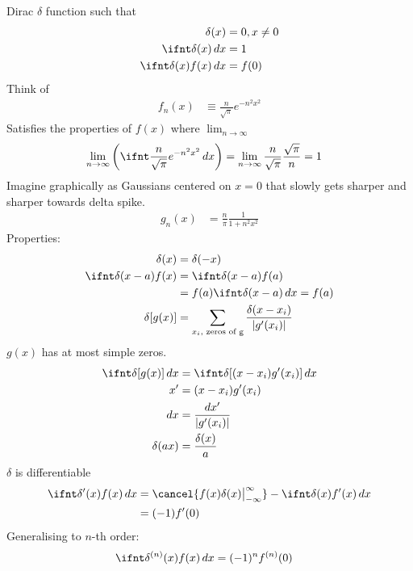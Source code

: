 \documentclass[cplx.tex]{subfiles}
\begin{document}
\chapter{}
Dirac $\delta$ function such that
\begin{align}
    \delta(x) &= 0, x \neq 0\\
    \ifnt \delta(x)\,dx &= 1 \\
    \ifnt \delta(x)f(x)\,dx &= f(0)
\end{align}
Think of 
\begin{align}
    f_n(x) &\equiv \frac{n}{\sqrt{\pi}} e^{-n^2x^2}
\end{align}
Satisfies the properties of $f(x)$ where $\lim_{n\to\infty}$
\begin{align}
    \lim_{n\to\infty} \left(\ifnt \frac{n}{\sqrt{\pi}} e^{-n^2x^2}\,dx\right) &= \lim_{n\to\infty} \frac{n}{\sqrt{\pi}} \frac{\sqrt{\pi}}{n} = 1
\end{align}
Imagine graphically as Gaussians centered on $x=0$ that slowly gets sharper and sharper towards delta spike.
\begin{align}
    g_n(x) &= \frac{n}{\pi}\frac{1}{1+n^2x^2}
\end{align}
Properties:
\begin{align}
    \delta(x) &= \delta(-x) \\
    \ifnt \delta(x-a)f(x) &= \ifnt \delta(x-a)f(a) \\
                          &= f(a) \ifnt \delta(x-a)\,dx = f(a) \\
    \delta[g(x)] &= \sum_{x_i, \text{ zeros of g}} \frac{\delta(x-x_i)}{|g'(x_i)|}
\end{align}
$g(x)$ has at most simple zeros.
\begin{align}
    \ifnt \delta[g(x)]\,dx &= \ifnt \delta[(x-x_i)g'(x_i)]\, dx \\
    x' &= (x-x_i)g'(x_i) \\
    dx &= \frac{dx'}{|g'(x_i)|} \\
    \delta(ax) &= \frac{\delta(x)}{a}
\end{align}
$\delta$ is differentiable
\begin{align}
    \ifnt \delta'(x)f(x)\,dx &= \cancel{f(x)\delta(x)\big|_{-\infty}^{\infty}} - \ifnt \delta(x)f'(x)\,dx \\
                             &= (-1)f'(0)
\end{align}
Generalising to $n$-th order:
\begin{align}
    \ifnt \delta^{(n)}(x)f(x)\,dx &= (-1)^nf^{(n)}(0)
\end{align}
\end{document}
